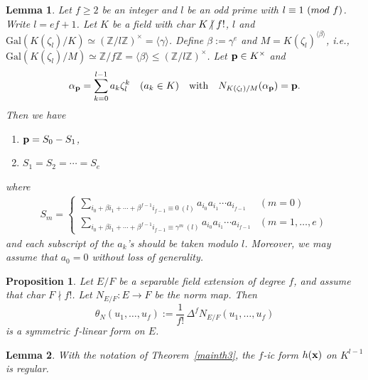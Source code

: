 \documentclass[10pt,a4paper]{amsart}
\newtheorem{lem}{Lemma}
\newtheorem{prop}{Proposition}
\newcommand{\Gal}{\mathrm{Gal}}
\newcommand{\Z}{\mathbb Z}
\newcommand{\notmid}{\mathrel{\ooalign{$\mkern-5mu\not$\crcr$|$}}}
\begin{document}
\begin{lem} \label{lem:BEW2}
Let $f\geq2$ be an integer and $l$ be an odd prime with $l \equiv 1\ ({\rm mod}\ f)$. 
Write $l=ef+1$.
Let $K$ be a field with char $K\notmid f!$, $l$ and 
$\Gal(K(\zeta_l)/K)\simeq (\Z/l\Z)^{\times}=\langle \gamma \rangle$. 
Define $\beta := \gamma^e$ and $M=K(\zeta_l)^{\langle \beta \rangle}$, 
i.e., $\Gal(K(\zeta_l)/M)\simeq \Z/f\Z = \langle \beta \rangle \leq  (\Z/l\Z)^{\times}$.
Let ${\bf p}\in K^{\times}$ and
\[
\alpha_{\bf p}=\sum_{k=0}^{l-1}a_k\zeta_l^k \quad (a_k \in K)\\
\quad \text{with} \quad
N_{K(\zeta_l)/M}(\alpha_{\bf p})= {\bf p}.
\]
Then we have
\begin{enumerate}
\item [$(1)$] ${\bf p} =S_0 - S_1$,
\item [$(2)$] $S_1=S_2=\cdots =S_{e}$
\end{enumerate}
where 
\begin{align*}
S_m = 
\left\{
\begin{array}{ll}
\displaystyle
\sum_{i_0 + \beta i_1 + \cdots +\beta^{f-1}i_{f-1}\equiv 0 \ (l)}a_{i_0}a_{i_1}\cdots a_{i_{f-1}} & (m = 0)\\
\displaystyle
\sum_{i_0 + \beta i_1 + \cdots +\beta^{f-1}i_{f-1}\equiv \gamma^{m} \ (l)}a_{i_0}a_{i_1}\cdots a_{i_{f-1}} & (m = 1,\ldots,e)
\end{array}
\right.
\end{align*}
and each subscript of the $a_k$'s should be taken modulo $l$. 
Moreover, we may assume that $a_0=0$ without loss of generality.
\end{lem}

\begin{prop}\label{prop:norm_polarization}
Let $E/F$ be a separable field extension of degree $f$, and assume that char $F \nmid f!$. 
Let $N_{E/F}\colon E\to F$ be the norm map.
Then
\[
\theta_N(u_1,\dots,u_f):=\frac{1}{f!}\,\Delta^f N_{E/F}(u_1,\dots,u_f)
\]
is a symmetric $f$-linear form on $E$.
\end{prop}

\begin{lem}\label{lem:h_regularity}
With the notation of Theorem~\ref{mainth3}, the $f$-ic form $h({\bf x})$ on $K^{l-1}$ is regular.
\end{lem}
\end{document}
